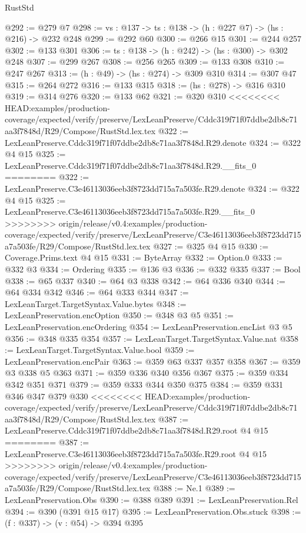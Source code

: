 \begin{lexlean}{RustStd}
\begin{coremodule}
{\begin{coremodule}
@292 := @279 @7
@298 := {vs : @137} -> {ts : @138} -> (h : @227 @7) -> (hs : @216) -> @232 @248
@299 := @292 @60
@300 := @266 @15
@301 := @244 @257
@302 := @133 @301
@306 := {ts : @138} -> (h : @242) -> (hs : @300) -> @302 @248
@307 := @299 @267
@308 := @256 @265
@309 := @133 @308
@310 := @247 @267
@313 := (h : @49) -> (hs : @274) -> @309 @310
@314 := @307 @47
@315 := @264 @272
@316 := @133 @315
@318 := (hs : @278) -> @316 @310
@319 := @314 @276
@320 := @133 @62
@321 := @320 @310
<<<<<<<< HEAD:examples/production-coverage/expected/verify/preserve/LexLeanPreserve/Cddc319f71f07ddbe2db8c71aa3f7848d/R29/Compose/RustStd.lex.tex
@322 := LexLeanPreserve.Cddc319f71f07ddbe2db8c71aa3f7848d.R29.denote
@324 := @322 @4 @15
@325 := LexLeanPreserve.Cddc319f71f07ddbe2db8c71aa3f7848d.R29.__fits_0
========
@322 := LexLeanPreserve.C3e46113036eeb3f8723dd715a7a503fe.R29.denote
@324 := @322 @4 @15
@325 := LexLeanPreserve.C3e46113036eeb3f8723dd715a7a503fe.R29.__fits_0
>>>>>>>> origin/release/v0.4:examples/production-coverage/expected/verify/preserve/LexLeanPreserve/C3e46113036eeb3f8723dd715a7a503fe/R29/Compose/RustStd.lex.tex
@327 := @325 @4 @15
@330 := Coverage.Prims.text @4 @15
@331 := ByteArray
@332 := Option.{0}
@333 := @332 @3
@334 := Ordering
@335 := @136 @3
@336 := @332 @335
@337 := Bool
@338 := @65 @337
@340 := @64 @3 @338
@342 := @64 @336 @340
@344 := @64 @334 @342
@346 := @64 @333 @344
@347 := LexLeanTarget.TargetSyntax.Value.bytes
@348 := LexLeanPreservation.encOption
@350 := @348 @3 @5
@351 := LexLeanPreservation.encOrdering
@354 := LexLeanPreservation.encList @3 @5
@356 := @348 @335 @354
@357 := LexLeanTarget.TargetSyntax.Value.nat
@358 := LexLeanTarget.TargetSyntax.Value.bool
@359 := LexLeanPreservation.encPair
@363 := @359 @63 @337 @357 @358
@367 := @359 @3 @338 @5 @363
@371 := @359 @336 @340 @356 @367
@375 := @359 @334 @342 @351 @371
@379 := @359 @333 @344 @350 @375
@384 := @359 @331 @346 @347 @379 @330
<<<<<<<< HEAD:examples/production-coverage/expected/verify/preserve/LexLeanPreserve/Cddc319f71f07ddbe2db8c71aa3f7848d/R29/Compose/RustStd.lex.tex
@387 := LexLeanPreserve.Cddc319f71f07ddbe2db8c71aa3f7848d.R29.root @4 @15
========
@387 := LexLeanPreserve.C3e46113036eeb3f8723dd715a7a503fe.R29.root @4 @15
>>>>>>>> origin/release/v0.4:examples/production-coverage/expected/verify/preserve/LexLeanPreserve/C3e46113036eeb3f8723dd715a7a503fe/R29/Compose/RustStd.lex.tex
@388 := Ne.{1}
@389 := LexLeanPreservation.Obs
@390 := @388 @389
@391 := LexLeanPreservation.Rel
@394 := @390 (@391 @15 @17)
@395 := LexLeanPreservation.Obs.stuck
@398 := (f : @337) -> (v : @54) -> @394 @395

\end{coremodule}}
\end{coremodule}
\end{lexlean}

